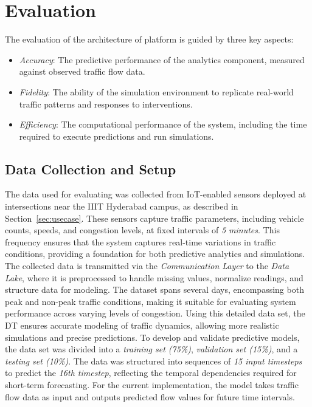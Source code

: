 \section{Evaluation}

The evaluation of the architecture of \digit platform is guided by three key aspects: 

\begin{itemize}
    \item \textit{Accuracy}: The predictive performance of the analytics component, measured against observed traffic flow data.  
    \item \textit{Fidelity}: The ability of the simulation environment to replicate real-world traffic patterns and responses to interventions.
    \item \textit{Efficiency}: The computational performance of the system, including the time required to execute predictions and run simulations.  
\end{itemize}

\subsection{Data Collection and Setup}

The data used for evaluating \digit was collected from IoT-enabled sensors deployed at intersections near the IIIT Hyderabad campus, as described in Section~\ref{sec:usecase}. These sensors capture traffic parameters, including vehicle counts, speeds, and congestion levels, at fixed intervals of \textit{5 minutes}. This frequency ensures that the system captures real-time variations in traffic conditions, providing a foundation for both predictive analytics and simulations. The collected data is transmitted via the \textit{Communication Layer} to the \textit{Data Lake}, where it is preprocessed to handle missing values, normalize readings, and structure data for modeling. The dataset spans several days, encompassing both peak and non-peak traffic conditions, making it suitable for evaluating system performance across varying levels of congestion. Using this detailed data set, the DT ensures accurate modeling of traffic dynamics, allowing more realistic simulations and precise predictions. To develop and validate predictive models, the data set was divided into a \textit{ training set (75\%)}, \textit{validation set (15\%)}, and a \textit{testing set (10\%)}. The data was structured into sequences of \textit{15 input timesteps} to predict the \textit{16th timestep}, reflecting the temporal dependencies required for short-term forecasting. For the current implementation, the model takes traffic flow data as input and outputs predicted flow values for future time intervals. 


